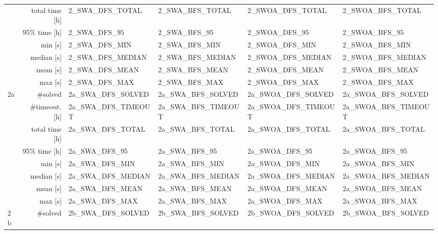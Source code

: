 \begin{table}
{{\begin{tabular}{|l|r|l|l|l|l|}
                      & total time [h] & 2_SWA_DFS_TOTAL       & 2_SWA_BFS_TOTAL       & 2_SWOA_DFS_TOTAL      & 2_SWOA_BFS_TOTAL       \\
                      & 95\% time [h]  & 2_SWA_DFS_95          & 2_SWA_BFS_95          & 2_SWOA_DFS_95         & 2_SWOA_BFS_95          \\
\cline{2-6}
                      & min [s]        & 2_SWA_DFS_MIN         & 2_SWA_BFS_MIN         & 2_SWOA_DFS_MIN        & 2_SWOA_BFS_MIN         \\
                      & median [s]     & 2_SWA_DFS_MEDIAN      & 2_SWA_BFS_MEDIAN      & 2_SWOA_DFS_MEDIAN     & 2_SWOA_BFS_MEDIAN      \\
                      & mean [s]       & 2_SWA_DFS_MEAN        & 2_SWA_BFS_MEAN        & 2_SWOA_DFS_MEAN       & 2_SWOA_BFS_MEAN        \\
                      & max [s]        & 2_SWA_DFS_MAX         & 2_SWA_BFS_MAX         & 2_SWOA_DFS_MAX        & 2_SWOA_BFS_MAX         \\
\hline
\hline
\multirow{8}{*}{2a}   & \#solved & 2a_SWA_DFS_SOLVED    & 2a_SWA_BFS_SOLVED    & 2a_SWOA_DFS_SOLVED   & 2a_SWOA_BFS_SOLVED    \\
                      & \#timeout. [h] & 2a_SWA_DFS_TIMEOUT    & 2a_SWA_BFS_TIMEOUT    & 2a_SWOA_DFS_TIMEOUT   & 2a_SWOA_BFS_TIMEOUT    \\
                      & total time [h] & 2a_SWA_DFS_TOTAL      & 2a_SWA_BFS_TOTAL      & 2a_SWOA_DFS_TOTAL     & 2a_SWOA_BFS_TOTAL      \\
                      & 95\% time [h]  & 2a_SWA_DFS_95         & 2a_SWA_BFS_95         & 2a_SWOA_DFS_95        & 2a_SWOA_BFS_95         \\
\cline{2-6}
                      & min [s]        & 2a_SWA_DFS_MIN        & 2a_SWA_BFS_MIN        & 2a_SWOA_DFS_MIN       & 2a_SWOA_BFS_MIN        \\
                      & median [s]     & 2a_SWA_DFS_MEDIAN     & 2a_SWA_BFS_MEDIAN     & 2a_SWOA_DFS_MEDIAN    & 2a_SWOA_BFS_MEDIAN     \\
                      & mean [s]       & 2a_SWA_DFS_MEAN       & 2a_SWA_BFS_MEAN       & 2a_SWOA_DFS_MEAN      & 2a_SWOA_BFS_MEAN       \\
                      & max [s]        & 2a_SWA_DFS_MAX        & 2a_SWA_BFS_MAX        & 2a_SWOA_DFS_MAX       & 2a_SWOA_BFS_MAX        \\
\hline
\hline
\multirow{8}{*}{2b}   & \#solved & 2b_SWA_DFS_SOLVED    & 2b_SWA_BFS_SOLVED    & 2b_SWOA_DFS_SOLVED   & 2b_SWOA_BFS_SOLVED    \\

\end{tabular}}}
\end{table}
